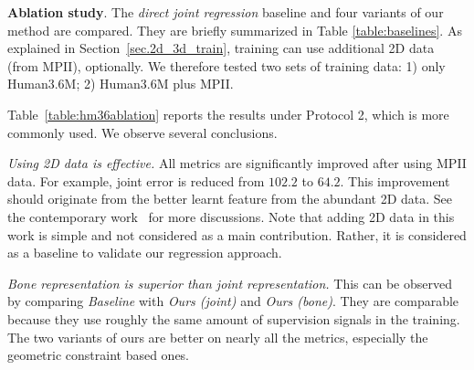 \documentclass[10pt,twocolumn,letterpaper]{article}
\begin{document}
\begin{comment}
Shoulder($\rightarrow$Thorax) & 115.6 & $104.4_{\downarrow11.2}$ & 57.7  & $52.2_{\downarrow5.5}$   & 55.1  & $48.5_{\downarrow6.6}$  & 25.9 & $12.6_{\downarrow13.3}$  & 1.9\%     & $0.8\%_{\downarrow1.1}$     \\
\end{tabular}
\caption{Detailed results on all joints for \emph{Baseline} and \emph{Ours (all)} methods, only trained on Human3.6M data (top half in Table~\ref{table:hm36ablation}). The relative performance gain is shown in the subscript. Note that the left most column shows the names for both the joint (and the bone).}
\label{table:joint_error_hm36_only}
\end{table*}
\end{comment}

\textbf{Ablation study}. The \emph{direct joint regression} baseline and four variants of our method are compared. They are briefly summarized in Table \ref{table:baselines}.
As explained in Section~\ref{sec.2d_3d_train}, training can use additional 2D data (from MPII), optionally. We therefore tested two sets of training data: 1) only Human3.6M; 2) Human3.6M plus MPII.

Table~\ref{table:hm36ablation} reports the results under Protocol 2, which is more commonly used. We observe several conclusions. 

\emph{Using 2D data is effective.} All metrics are significantly improved after using MPII data. For example, joint error is reduced from $102.2$ to $64.2$. This improvement should originate from the better learnt feature from the abundant 2D data. See the contemporary work~\cite{zhou2016towards} for more discussions. Note that adding 2D data in this work is simple and not considered as a main contribution. Rather, it is considered as a baseline to validate our regression approach.

\emph{Bone representation is superior than joint representation.} This can be observed by comparing \emph{Baseline} with \emph{Ours (joint)} and \emph{Ours (bone)}. They are comparable because they use roughly the same amount of supervision signals in the training. The two variants of ours are better on nearly all the metrics, especially the geometric constraint based ones. 

\end{document}
